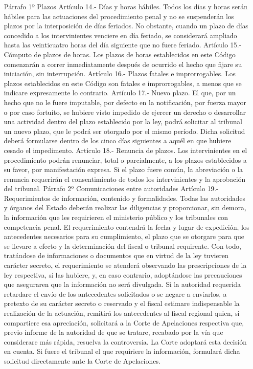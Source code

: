     Párrafo 1º Plazos
    Artículo 14.- Días y horas hábiles. Todos los días y horas serán hábiles para las actuaciones del procedimiento penal y no se suspenderán los plazos por la interposición de días feriados.
    No obstante, cuando un plazo de días concedido a los intervinientes venciere en día feriado, se considerará ampliado hasta las veinticuatro horas del día siguiente que no fuere feriado.
    Artículo 15.- Cómputo de plazos de horas. Los plazos de horas establecidos en este Código comenzarán a correr inmediatamente después de ocurrido el hecho que fijare su iniciación, sin interrupción.
    Artículo 16.- Plazos fatales e improrrogables. Los plazos establecidos en este Código son fatales e improrrogables, a menos que se indicare expresamente lo contrario.
    Artículo 17.- Nuevo plazo. El que, por un hecho que no le fuere imputable, por defecto en la notificación, por fuerza mayor o por caso fortuito, se hubiere visto impedido de ejercer un derecho o desarrollar una actividad dentro del plazo establecido por la ley, podrá solicitar al tribunal un nuevo plazo, que le podrá ser otorgado por el mismo período. Dicha solicitud deberá formularse dentro de los cinco días siguientes a aquél en que hubiere cesado el impedimento.
    Artículo 18.- Renuncia de plazos. Los intervinientes en el procedimiento podrán renunciar, total o parcialmente, a los plazos establecidos a su favor, por manifestación expresa.
    Si el plazo fuere común, la abreviación o la renuncia requerirán el consentimiento de todos los intervinientes y la aprobación del tribunal.
    Párrafo 2º Comunicaciones entre autoridades
    Artículo 19.- Requerimientos de información, contenido y formalidades. Todas las autoridades y órganos del Estado deberán realizar las diligencias y proporcionar, sin demora, la información que les requirieren el ministerio público y los tribunales con competencia penal. El requerimiento contendrá la fecha y lugar de expedición, los antecedentes necesarios para su cumplimiento, el plazo que se otorgare para que se llevare a efecto y la determinación del fiscal o tribunal requirente.
    Con todo, tratándose de informaciones o documentos que en virtud de la ley tuvieren carácter secreto, el requerimiento se atenderá observando las prescripciones de la ley respectiva, si las hubiere, y, en caso contrario, adoptándose las precauciones que aseguraren que la información no será divulgada.
    Si la autoridad requerida retardare el envío de los antecedentes solicitados o se negare a enviarlos, a pretexto de su carácter secreto o reservado y el fiscal estimare indispensable la realización de la actuación, remitirá los antecedentes al fiscal regional quien, si compartiere esa apreciación, solicitará a la Corte de Apelaciones respectiva que, previo informe de la autoridad de que se tratare, recabado por la vía que considerare más rápida, resuelva la controversia. La Corte adoptará esta decisión en cuenta. Si fuere el tribunal el que requiriere la información, formulará dicha solicitud directamente ante la Corte de Apelaciones.

